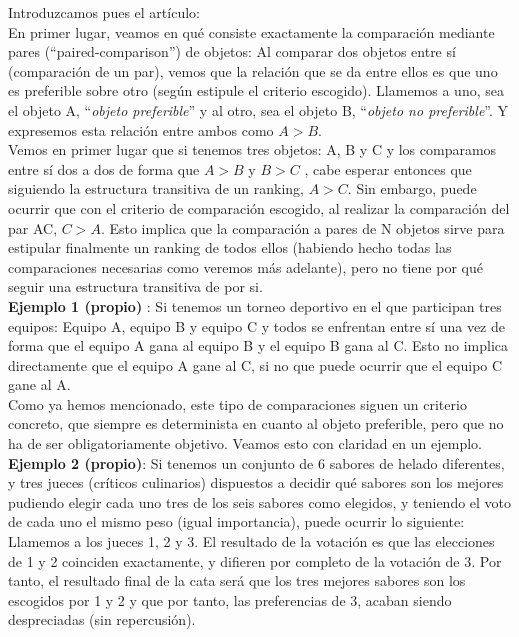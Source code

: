 \documentclass[a4paper]{article}
\begin{document}
	Introduzcamos pues el artículo:\\
	

	En primer lugar, veamos en qué consiste exactamente la comparación mediante pares (“paired-comparison”) de objetos: Al comparar dos objetos entre sí (comparación de un par), vemos que la relación que se da entre ellos es que uno es preferible sobre otro (según estipule el criterio escogido). Llamemos a uno, sea el objeto A, “\textit{objeto preferible}” y al otro, sea el objeto B, “\textit{objeto no preferible}”. Y expresemos esta relación entre ambos como $A > B$.\\
	

	Vemos en primer lugar que si tenemos tres objetos: A, B y C  y los comparamos entre sí dos a dos de forma que $A > B$ y $B > C$ , cabe esperar entonces que siguiendo la estructura transitiva de un ranking, $A > C$. Sin embargo, puede ocurrir que con el criterio de comparación escogido, al realizar la comparación del par AC, $C > A$. Esto implica que la comparación a pares de N objetos sirve para estipular finalmente un ranking de todos ellos (habiendo hecho todas las comparaciones necesarias como veremos más adelante), pero no tiene por qué seguir una estructura transitiva de por si.\\
	

	\textbf{Ejemplo 1 (propio)} :
	Si tenemos un torneo deportivo en el que participan tres equipos: Equipo A, equipo B y equipo C y todos se enfrentan entre sí una vez de forma que el equipo A gana al equipo B y el equipo B gana al C. Esto no implica directamente que el equipo A gane al C, si no que puede ocurrir que el equipo C gane al A.\\
	

	Como ya hemos mencionado, este tipo de comparaciones siguen un criterio concreto, que siempre es determinista en cuanto al objeto preferible, pero que no ha de ser obligatoriamente objetivo. Veamos esto con claridad en un ejemplo. \\
	

	\textbf{Ejemplo 2 (propio)}:
	Si tenemos un conjunto de 6 sabores de helado diferentes, y tres jueces (críticos culinarios) dispuestos a decidir qué sabores son los mejores pudiendo elegir cada uno tres de los seis sabores como elegidos, y teniendo el voto de cada uno el mismo peso (igual importancia), puede ocurrir lo siguiente: \\
	
	Llamemos a los jueces 1, 2 y 3. El resultado de la votación es que las elecciones de 1 y 2 coinciden exactamente, y difieren por completo de la votación de 3. Por tanto, el resultado final de la cata será que los tres mejores sabores son los escogidos por 1 y 2 y que por tanto, las preferencias de 3, acaban siendo despreciadas (sin repercusión).\\
	
\end{document}
